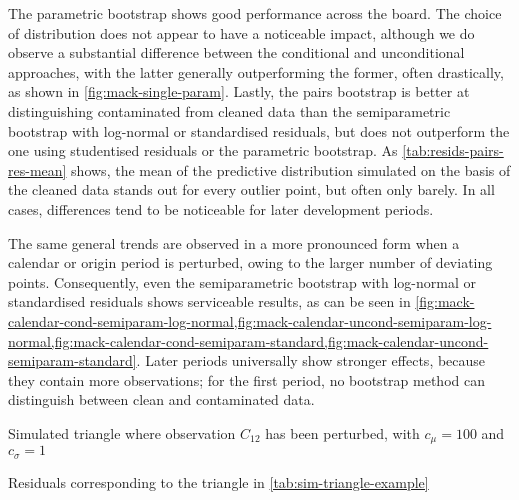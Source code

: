 \documentclass[a4paper]{book}
\begin{document}
The parametric bootstrap shows good performance across the board. The choice of distribution does not appear to have a noticeable impact, although we do observe a substantial difference between the conditional and unconditional approaches, with the latter generally outperforming the former, often drastically, as shown in \cref{fig:mack-single-param}. Lastly, the pairs bootstrap is better at distinguishing contaminated from cleaned data than the semiparametric bootstrap with log-normal or standardised residuals, but does not outperform the one using studentised residuals or the parametric bootstrap. As \cref{tab:resids-pairs-res-mean} shows, the mean of the predictive distribution simulated on the basis of the cleaned data stands out for every outlier point, but often only barely. In all cases, differences tend to be noticeable for later development periods.

The same general trends are observed in a more pronounced form when a calendar or origin period is perturbed, owing to the larger number of deviating points. Consequently, even the semiparametric bootstrap with log-normal or standardised residuals shows serviceable results, as can be seen in \cref{fig:mack-calendar-cond-semiparam-log-normal,fig:mack-calendar-uncond-semiparam-log-normal,fig:mack-calendar-cond-semiparam-standard,fig:mack-calendar-uncond-semiparam-standard}. Later periods universally show stronger effects, because they contain more observations; for the first period, no bootstrap method can distinguish between clean and contaminated data.

\begin{table}[!htb]
  
  \caption{Simulated triangle where observation $C_{12}$ has been perturbed, with $c_\mu = 100$ and $c_\sigma = 1$}
  \label{tab:sim-triangle-example}
\end{table}

\begin{table}[!htb]
  \setlength\tabcolsep{3pt}
  \begin{subtable}{0.45\linewidth}
    \centering
    
    \label{tab:resids-standard-example}
  \end{subtable}
  \hfill
  \begin{subtable}{0.45\linewidth}
    \centering
    
    \label{tab:resids-log-normal-example}
  \end{subtable}
  \caption{Residuals corresponding to the triangle in \cref{tab:sim-triangle-example}}
\end{table}
\end{document}
